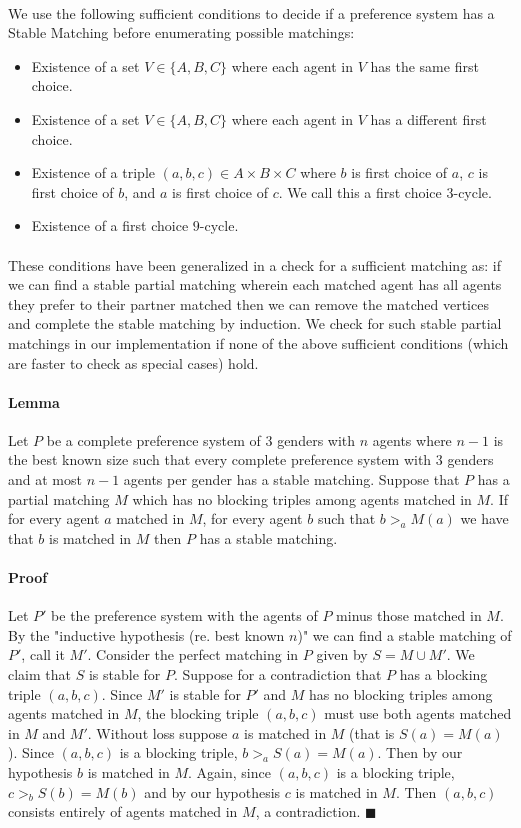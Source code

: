 \documentclass[letterpaper,12pt,oneside,onecolumn]{article}
\begin{document}
\paragraph{}
We use the following sufficient conditions to decide if a preference system has a Stable Matching before enumerating possible matchings:
\begin{itemize}
\item Existence of a set $V \in \{A,B,C\}$ where each agent in $V$ has the same first choice.
\item Existence of a set $V \in \{A,B,C\}$ where each agent in $V$ has a different first choice.
\item Existence of a triple $(a,b,c) \in A\times B\times C$ where $b$ is first choice of $a$, $c$ is first choice of $b$, and $a$ is first choice of $c$. We call this a first choice $3$-cycle.
\item Existence of a first choice $9$-cycle.
\end{itemize}
\paragraph{}
These conditions have been generalized in a check for a sufficient matching as: if we can find a stable partial matching wherein each matched agent has all agents they prefer to their partner matched then we can remove the matched vertices and complete the stable matching by induction. We check for such stable partial matchings in our implementation if none of the above sufficient conditions (which are faster to check as special cases) hold.
\paragraph{Lemma}
Let $P$ be a complete preference system of $3$ genders with $n$ agents where $n-1$ is the best known size such that every complete preference system with $3$ genders and at most $n-1$ agents per gender has a stable matching. Suppose that $P$ has a partial matching $M$ which has no blocking triples among agents matched in $M$. If for every agent $a$ matched in $M$, for every agent $b$ such that $b >_a M(a)$ we have that $b$ is matched in $M$ then $P$ has a stable matching.
\paragraph{Proof}
Let $P'$ be the preference system with the agents of $P$ minus those matched in $M$. By the "inductive hypothesis (re. best known $n$)" we can find a stable matching of $P'$, call it $M'$. Consider the perfect matching in $P$ given by $S = M \cup M'$. We claim that $S$ is stable for $P$. Suppose for a contradiction that $P$ has a blocking triple $(a,b,c)$. Since $M'$ is stable for $P'$ and $M$ has no blocking triples among agents matched in $M$, the blocking triple $(a,b,c)$ must use both agents matched in $M$ and $M'$. Without loss suppose $a$ is matched in $M$ (that is $S(a) = M(a)$). Since $(a,b,c)$ is a blocking triple, $b >_a S(a) = M(a)$. Then by our hypothesis $b$ is matched in $M$. Again, since $(a,b,c)$ is a blocking triple, $c >_b S(b) = M(b)$ and by our hypothesis $c$ is matched in $M$. Then $(a,b,c)$ consists entirely of agents matched in $M$, a contradiction. $\blacksquare$
\end{document}
